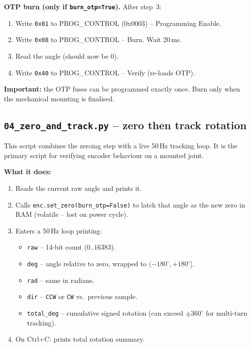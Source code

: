 \documentclass[11pt,a4paper]{article}
\begin{document}
\textbf{OTP burn (only if \texttt{burn\_otp=True}).}  After step~3:
\begin{enumerate}
  \item Write \texttt{0x01} to PROG\_CONTROL (0x0003) -- Programming
        Enable.
  \item Write \texttt{0x08} to PROG\_CONTROL -- Burn.  Wait 20\,ms.
  \item Read the angle (should now be 0).
  \item Write \texttt{0x40} to PROG\_CONTROL -- Verify (re-loads OTP).
\end{enumerate}
\textbf{Important:} the OTP fuses can be programmed exactly once.  Burn
only when the mechanical mounting is finalised.

\subsection{\texttt{04\_zero\_and\_track.py} -- zero then track rotation}
This script combines the zeroing step with a live 50\,Hz tracking loop.
It is the primary script for verifying encoder behaviour on a mounted
joint.

\textbf{What it does:}
\begin{enumerate}
  \item Reads the current raw angle and prints it.
  \item Calls \texttt{enc.set\_zero(burn\_otp=False)} to latch that
        angle as the new zero in RAM (volatile -- lost on power cycle).
  \item Enters a 50\,Hz loop printing:
        \begin{itemize}
          \item \texttt{raw} -- 14-bit count (0..16383).
          \item \texttt{deg} -- angle relative to zero, wrapped to
                $(-180^{\circ}, +180^{\circ}]$.
          \item \texttt{rad} -- same in radians.
          \item \texttt{dir} -- \texttt{CCW} or \texttt{CW} vs.\ previous
                sample.
          \item \texttt{total\_deg} -- cumulative signed rotation (can
                exceed $\pm 360^{\circ}$ for multi-turn tracking).
        \end{itemize}
  \item On Ctrl+C: prints total rotation summary.
\end{enumerate}
\end{document}
